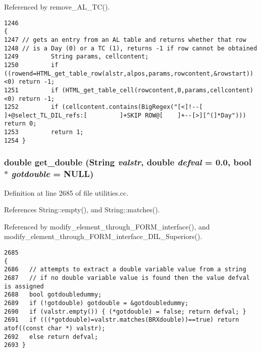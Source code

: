 Referenced by remove\_\-AL\_\-TC().



\footnotesize\begin{verbatim}1246                                                                                                {
1247 // gets an entry from an AL table and returns whether that row
1248 // is a Day (0) or a TC (1), returns -1 if row cannot be obtained
1249         String params, cellcontent;
1250         if ((rowend=HTML_get_table_row(alstr,alpos,params,rowcontent,&rowstart))<0) return -1;
1251         if (HTML_get_table_cell(rowcontent,0,params,cellcontent)<0) return -1;
1252         if (cellcontent.contains(BigRegex("[<]!--[      ]+@select_TL_DIL_refs:[         ]+SKIP ROW@[    ]+--[>][^(]*Day"))) return 0;
1253         return 1;
1254 }
\end{verbatim}\normalsize 
{}
\subsubsection{\setlength{\rightskip}{0pt plus 5cm}double get\_\-double ({\bf String} {\em valstr}, double {\em defval} = 0.0, bool $\ast$ {\em gotdouble} = NULL)}\label{dil2al_8hh_a281}




Definition at line 2685 of file utilities.cc.

References String::empty(), and String::matches().

Referenced by modify\_\-element\_\-through\_\-FORM\_\-interface(), and modify\_\-element\_\-through\_\-FORM\_\-interface\_\-DIL\_\-Superiors().



\footnotesize\begin{verbatim}2685                                                                                {
2686   // attempts to extract a double variable value from a string
2687   // if no double variable value is found then the value defval is assigned
2688   bool gotdoubledummy;
2689   if (!gotdouble) gotdouble = &gotdoubledummy;
2690   if (valstr.empty()) { (*gotdouble) = false; return defval; }
2691   if (((*gotdouble)=valstr.matches(BRXdouble))==true) return atof((const char *) valstr);
2692   else return defval;
2693 }
\end{verbatim}\normalsize 
{}
